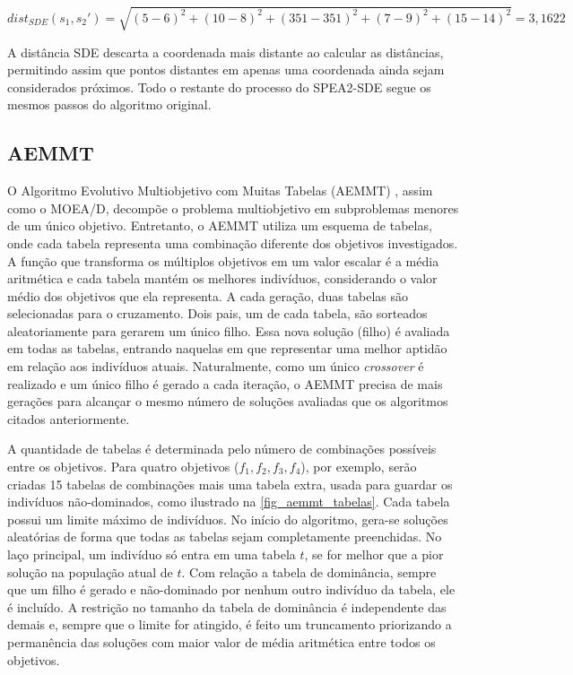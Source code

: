 \[dist_{SDE}(s_1, s_2') = \sqrt{(5-6)^2 + (10-8)^2 + (351-351)^2 + (7-9)^2 + (15-14)^2} = 3,1622\]

A distância SDE descarta a coordenada mais distante ao calcular as distâncias, permitindo assim que pontos distantes em apenas uma coordenada ainda sejam considerados próximos. Todo o restante do processo do SPEA2-SDE segue os mesmos passos do algoritmo original.

\subsection{AEMMT}

O Algoritmo Evolutivo Multiobjetivo com Muitas Tabelas (AEMMT) \cite{Brasil2013}, assim como o MOEA/D, decompõe o problema multiobjetivo em subproblemas menores de um único objetivo. Entretanto, o AEMMT utiliza um esquema de tabelas, onde cada tabela representa uma combinação diferente dos objetivos investigados. A função que transforma os múltiplos objetivos em um valor escalar é a média aritmética e cada tabela mantém os melhores indivíduos, considerando o valor médio dos objetivos que ela representa. A cada geração, duas tabelas são selecionadas para o cruzamento. Dois pais, um de cada tabela, são sorteados aleatoriamente para gerarem um único filho. Essa nova solução (filho) é avaliada em todas as tabelas, entrando naquelas em que representar uma melhor aptidão em relação aos indivíduos atuais. Naturalmente, como um único \textit{crossover} é realizado e um único filho é gerado a cada iteração, o AEMMT precisa de mais gerações para alcançar o mesmo número de soluções avaliadas que os algoritmos citados anteriormente.

A quantidade de tabelas é determinada pelo número de combinações possíveis entre os objetivos. Para quatro objetivos ($f_1, f_2, f_3, f_4$), por exemplo, serão criadas 15 tabelas de combinações mais uma tabela extra, usada para guardar os indivíduos não-dominados, como ilustrado na \autoref{fig_aemmt_tabelas}. Cada tabela possui um limite máximo de indivíduos. No início do algoritmo, gera-se soluções aleatórias de forma que todas as tabelas sejam completamente preenchidas. No laço principal, um indivíduo só entra em uma tabela $t$, se for melhor que a pior solução na população atual de $t$. Com relação a tabela de dominância, sempre que um filho é gerado e não-dominado por nenhum outro indivíduo da tabela, ele é incluído. A restrição no tamanho da tabela de dominância é independente das demais e, sempre que o limite for atingido, é feito um truncamento priorizando a permanência das soluções com maior valor de média aritmética entre todos os objetivos.

